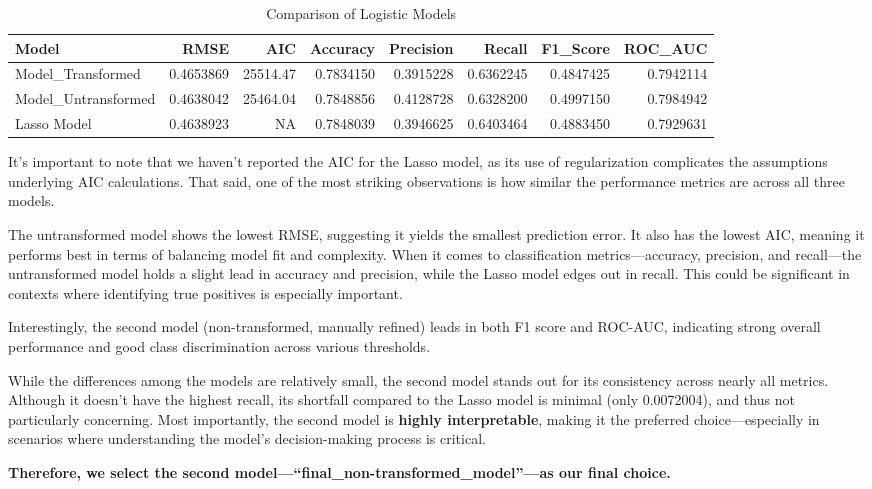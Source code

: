 \documentclass[
]{article}
\begin{document}
\begin{table}[H]
\centering\centering
\caption{\label{tab:unnamed-chunk-12}Comparison of Logistic Models}
\centering
\begin{tabular}[t]{l|r|r|r|r|r|r|r}
\hline
Model & RMSE & AIC & Accuracy & Precision & Recall & F1\_Score & ROC\_AUC\\
\hline
Model\_Transformed & 0.4653869 & 25514.47 & 0.7834150 & 0.3915228 & 0.6362245 & 0.4847425 & 0.7942114\\
\hline
Model\_Untransformed & 0.4638042 & 25464.04 & 0.7848856 & 0.4128728 & 0.6328200 & 0.4997150 & 0.7984942\\
\hline
Lasso Model & 0.4638923 & NA & 0.7848039 & 0.3946625 & 0.6403464 & 0.4883450 & 0.7929631\\
\hline
\end{tabular}
\end{table}

It's important to note that we haven't reported the AIC for the Lasso
model, as its use of regularization complicates the assumptions
underlying AIC calculations. That said, one of the most striking
observations is how similar the performance metrics are across all three
models.

The untransformed model shows the lowest RMSE, suggesting it yields the
smallest prediction error. It also has the lowest AIC, meaning it
performs best in terms of balancing model fit and complexity. When it
comes to classification metrics---accuracy, precision, and recall---the
untransformed model holds a slight lead in accuracy and precision, while
the Lasso model edges out in recall. This could be significant in
contexts where identifying true positives is especially important.

Interestingly, the second model (non-transformed, manually refined)
leads in both F1 score and ROC-AUC, indicating strong overall
performance and good class discrimination across various thresholds.

While the differences among the models are relatively small, the second
model stands out for its consistency across nearly all metrics. Although
it doesn't have the highest recall, its shortfall compared to the Lasso
model is minimal (only 0.0072004), and thus not particularly concerning.
Most importantly, the second model is \textbf{highly interpretable},
making it the preferred choice---especially in scenarios where
understanding the model's decision-making process is critical.

\textbf{Therefore, we select the second
model---``final\_non-transformed\_model''---as our final choice.}
\end{document}
